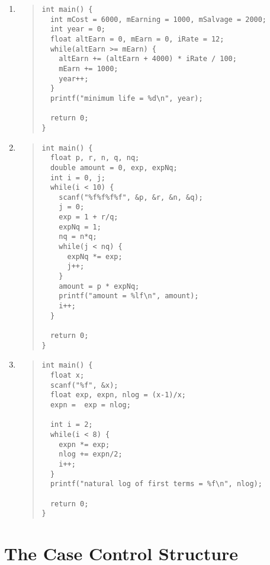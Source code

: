 \documentclass{report}
\begin{document}
\begin{enumerate}
  \item \begin{quote} \begin{verbatim} 
int main() {
  int mCost = 6000, mEarning = 1000, mSalvage = 2000;
  int year = 0;
  float altEarn = 0, mEarn = 0, iRate = 12;
  while(altEarn >= mEarn) {
    altEarn += (altEarn + 4000) * iRate / 100;
    mEarn += 1000;
    year++;
  }
  printf("minimum life = %d\n", year);

  return 0;
}
  \end{verbatim} \end{quote}

  \item \begin{quote} \begin{verbatim} 
int main() {
  float p, r, n, q, nq; 
  double amount = 0, exp, expNq;
  int i = 0, j;
  while(i < 10) {
    scanf("%f%f%f%f", &p, &r, &n, &q);
    j = 0; 
    exp = 1 + r/q;
    expNq = 1;
    nq = n*q;
    while(j < nq) {
      expNq *= exp;
      j++;
    }
    amount = p * expNq;
    printf("amount = %lf\n", amount);
    i++;
  }

  return 0;
}
  \end{verbatim} \end{quote}

  \item \begin{quote} \begin{verbatim} 
int main() {
  float x; 
  scanf("%f", &x);
  float exp, expn, nlog = (x-1)/x;
  expn =  exp = nlog;

  int i = 2;
  while(i < 8) {
    expn *= exp;
    nlog += expn/2;
    i++;
  }
  printf("natural log of first terms = %f\n", nlog);

  return 0;
}
  \end{verbatim} \end{quote}
\end{enumerate}





\chapter{The Case Control Structure}
\end{document}
